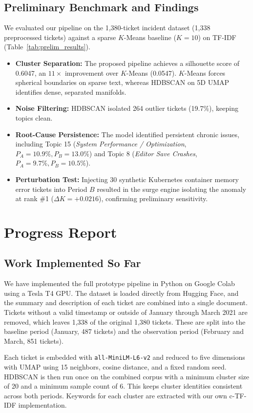 \documentclass[11pt]{article}
\begin{document}
\subsection{Preliminary Benchmark and Findings}
We evaluated our pipeline on the 1,380-ticket incident dataset (1,338 preprocessed tickets) against a sparse $K$-Means baseline ($K = 10$) on TF-IDF (Table~\ref{tab:prelim_results}).
\begin{itemize}
    \item \textbf{Cluster Separation:} The proposed pipeline achieves a silhouette score of 0.6047, an $11\times$ improvement over $K$-Means (0.0547). $K$-Means forces spherical boundaries on sparse text, whereas HDBSCAN on 5D UMAP identifies dense, separated manifolds.
    \item \textbf{Noise Filtering:} HDBSCAN isolated 264 outlier tickets (19.7\%), keeping topics clean.
    \item \textbf{Root-Cause Persistence:} The model identified persistent chronic issues, including Topic 15 (\textit{System Performance / Optimization}, $P_A = 10.9\%, P_B = 13.0\%$) and Topic 8 (\textit{Editor Save Crashes}, $P_A = 9.7\%, P_B = 10.5\%$).
    \item \textbf{Perturbation Test:} Injecting 30 synthetic Kubernetes container memory error tickets into Period $B$ resulted in the surge engine isolating the anomaly at rank \#1 ($\Delta K = +0.0216$), confirming preliminary sensitivity.
\end{itemize}

\section{Progress Report}

\subsection{Work Implemented So Far}
We have implemented the full prototype pipeline in Python on Google Colab using a Tesla T4 GPU. The dataset is loaded directly from Hugging Face, and the summary and description of each ticket are combined into a single document. Tickets without a valid timestamp or outside of January through March 2021 are removed, which leaves 1,338 of the original 1,380 tickets. These are split into the baseline period (January, 487 tickets) and the observation period (February and March, 851 tickets).

Each ticket is embedded with \texttt{all-MiniLM-L6-v2} and reduced to five dimensions with UMAP using 15 neighbors, cosine distance, and a fixed random seed. HDBSCAN is then run once on the combined corpus with a minimum cluster size of 20 and a minimum sample count of 6. This keeps cluster identities consistent across both periods. Keywords for each cluster are extracted with our own c-TF-IDF implementation.
\end{document}
